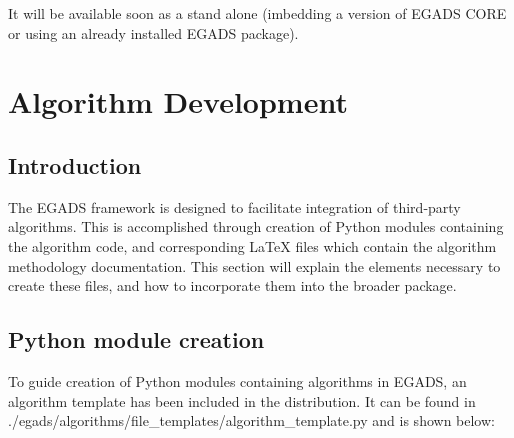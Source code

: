 \documentclass[a4paper,10pt,openany,english]{sphinxmanual}
\begin{document}
\begin{sphinxVerbatim}[commandchars=\\\{\}]
 
\end{sphinxVerbatim}

It will be available soon as a stand alone (imbedding a version of EGADS CORE or using an already installed EGADS package).


\chapter{Algorithm Development}
\label{alg_development::doc}\label{alg_development:algorithm-development}

\section{Introduction}
\label{alg_development:introduction}
The EGADS framework is designed to facilitate integration of third-party algorithms. This is accomplished through creation of Python modules containing the algorithm code, and corresponding LaTeX files which contain the algorithm methodology documentation. This section will explain the elements necessary to create these files, and how to incorporate them into the broader package.


\section{Python module creation}
\label{alg_development:python-module-creation}
To guide creation of Python modules containing algorithms in EGADS, an algorithm template has been included in the distribution. It can be found in ./egads/algorithms/file\_templates/algorithm\_template.py and is shown below:
\end{document}
